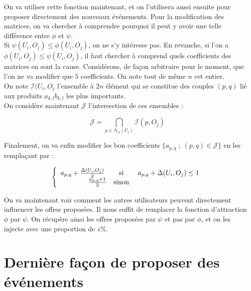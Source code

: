 \documentclass[11pt, oneside]{article}
\begin{document}
On va utiliser cette fonction maintenant, et on l'utilisera aussi ensuite pour proposer directement des nouveaux événements. Pour la modification des matrices, on va chercher à comprendre pourquoi il peut y avoir une telle différence entre $\phi$ et $\psi$. \\
 Si $\psi(U_i,O_j) \leq \phi(U_i,O_j)$, on ne s'y intéresse pas. En revanche, si l'on a $\phi(U_i,O_j) \leq \psi(U_i,O_j)$, il faut chercher à comprend quels coefficients des matrices en sont la cause. Considérons, de façon arbitraire pour le moment, que l'on ne va modifier que $5$ coefficients. On note tout de même $n$ cet entier. \\
On note $\mathcal{I} (U_i,O_j$ l'ensemble à $2n$ élément qui se constitue des couples $(p,q)$ lié aux produits $a_{k,l}b_{k,l} $ les plus importants. \\
On considère maintenant $\mathcal{J}$ l'intersection de ces ensembles :
\begin{center}
\[
\mathcal{J} = \bigcap _{p \in \mathcal{N} _k (U_i) } \mathcal{I} (p,O_j)
\]

\end{center}

Finalement, on va enfin modifier les bon coefficients $\{a_{p,q} \; ; \; (p,q) \in \mathcal{J} \} $ en les remplaçant par :
\begin{center}
\[
 \left \{
   \begin{array}{r c l}
       a_{p,q} + \frac{\Delta (U_i,O_j)}{2} \;  &\text{si}& \; a_{p,q} + \Delta (U_i,O_j) \leq 1  \\
       \frac{ a_{p,q} + 1}{2} &\text{sinon}& \\
   \end{array}
   \right .
\]
\end{center}

On va maintenant voir comment les autres utilisateurs peuvent directement influencer les offres proposées. Il nous suffit de remplacer la fonction d'attraction $\phi$ par $\psi$. On récupère ainsi les offres proposées par $\psi$ et pas par $\phi$, et on les injecte avec une proportion de $z \%$.

\section{Dernière façon de proposer des événements}
\end{document}
